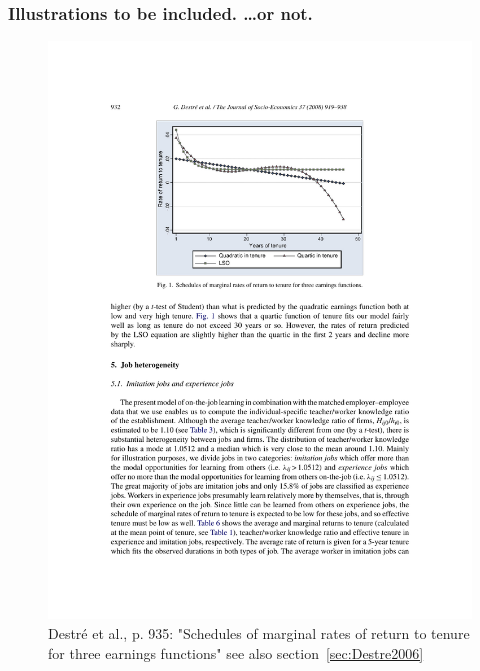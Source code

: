 \documentclass[12pt,a4paper]{article}
\begin{document}
  \subsubsection{Illustrations to be included. …or not.}
    \begin{figure}[htb]
      \centering
      \includegraphics[width=12cm]{Meeting 4 LEARNING FROM EXPERIENCE - Seite 932.pdf}
      \caption{Destré et al., p. 935: "Schedules of marginal rates of return to tenure for three earnings functions" see also section~\ref{sec:Destre2006}}
      \label{fig:Destré marginalreturntotenureearningfunction}
    \end{figure}
\end{document}
